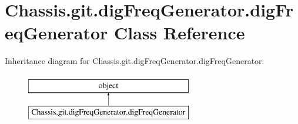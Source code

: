 \hypertarget{class_chassis_8git_1_1dig_freq_generator_1_1dig_freq_generator}{\section{Chassis.\-git.\-dig\-Freq\-Generator.\-dig\-Freq\-Generator Class Reference}
\label{class_chassis_8git_1_1dig_freq_generator_1_1dig_freq_generator}
}
Inheritance diagram for Chassis.\-git.\-dig\-Freq\-Generator.\-dig\-Freq\-Generator\-:\begin{figure}[H]
\begin{center}
\leavevmode
\includegraphics[height=2.000000cm]{class_chassis_8git_1_1dig_freq_generator_1_1dig_freq_generator}
\end{center}
\end{figure}
